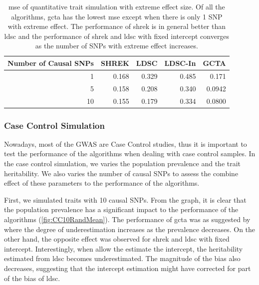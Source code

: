 		\begin{table}
			\centering
			\begin{tabular}{rrrrr}
				\toprule
				Number of Causal SNPs&	SHREK&	LDSC&	LDSC-In&	GCTA \\
				\midrule
				1	&	0.168	&	0.329	&	0.485	&	0.171\\
				5	&	0.158	&	0.208	&	0.340	&	0.0942\\
				10	&	0.155	&	0.179	&	0.334	&	0.0800\\
				\bottomrule
			\end{tabular}
			\caption[Mean Squared Error of Quantitative Trait Simulation with Extreme Effect Size]{
				\gls{mse} of quantitative trait simulation with extreme effect size.
				Of all the algorithms, \gls{gcta} has the lowest \gls{mse} except when there is only 1 \gls{SNP} with extreme effect.
				The performance of \gls{shrek} is in general better than \gls{ldsc} and the performance of \gls{shrek} and \gls{ldsc} with fixed intercept converges as the number of \glspl{SNP} with extreme effect increases.}
			\label{tab:mseEx100c}
		\end{table}
		
		\subsubsection{Case Control Simulation}
		
		Nowadays, most of the \gls{GWAS} are Case Control studies, thus it is important to test the performance of the algorithms when dealing with case control samples. 
		In the case control simulation, we varies the population prevalence and the trait heritability. 
		We also varies the number of causal \glspl{SNP} to assess the combine effect of these parameters to the performance of the algorithms.
		
		First, we simulated traits with 10 causal \glspl{SNP}.
		From the graph, it is clear that the population prevalence has a significant impact to the performance of the algorithms (\cref{fig:CC10RandMean}). 
		The performance of \gls{gcta} was as suggested by \citet{Golan2014} where the degree of underestimation increases as the prevalence decreases.
		On the other hand, the opposite effect was observed for \gls{shrek} and \gls{ldsc} with fixed intercept.
		Interestingly, when allow the estimate the intercept, the heritability estimated from \gls{ldsc} becomes underestimated. 
		The magnitude of the bias also decreases, suggesting that the intercept estimation might have corrected for part of the bias of \gls{ldsc}.
		
